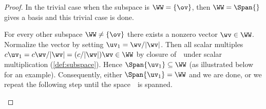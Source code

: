 \begin{proof} 
In the trivial case when the subspace is \(\WW=\{\ov\}\), then \(\WW=\Span\{\}\) gives a basis and this trivial case is done.

For every other subspace \(\WW\neq\{\ov\}\) there exists a nonzero vector \(\wv\in\WW\).
Normalize the vector by setting \(\uv_1=\wv/|\wv|\).
Then all scalar multiples \(c\uv_1=c\wv/|\wv|=(c/|\wv|)\wv\in\WW\) by closure of~\WW\ under scalar multiplication (\cref{def:subspace}). 
Hence \(\Span\{\uv_1\}\subseteq\WW\) (as illustrated below for an example).
Consequently, either  \(\Span\{\uv_1\}=\WW\) and we are done, or we repeat the following step until the space~\WW\ is spanned.
\begin{center}
\end{center}


\end{proof}
